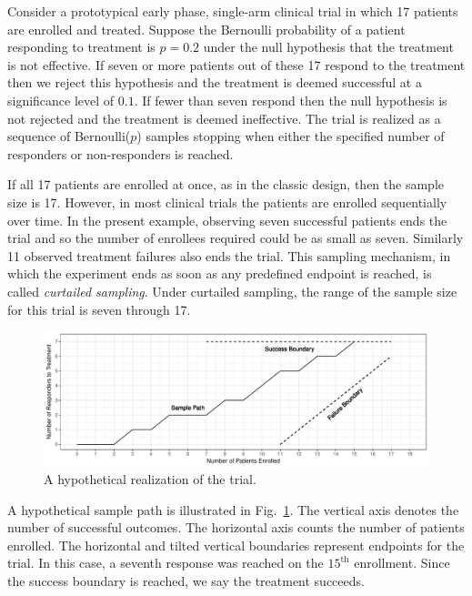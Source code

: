 \documentclass[12pt]{article}
\begin{document}
Consider a prototypical early phase, single-arm clinical trial in which 
17 patients
are enrolled and treated. Suppose the Bernoulli probability of a patient 
responding to treatment is $p=0.2$ 
under the null hypothesis that the treatment is not effective.
If seven or more patients out of these 17 respond to the treatment then we 
reject this hypothesis and the treatment is deemed successful at 
a significance level of $0.1$.  If fewer than seven respond then the null 
hypothesis is not 
rejected and the treatment is deemed ineffective. The trial is 
realized as a sequence of Bernoulli($p$) samples stopping when either
the specified number of responders or non-responders is reached.

If all 17 patients are enrolled at once, as in the classic
design, then the sample size is 17. However, in most clinical trials the
patients are enrolled sequentially over time.
In the present example, observing seven
successful patients ends the trial and so the number of enrollees required
could be as small as seven. Similarly 11
observed treatment failures also ends the trial. This sampling mechanism, in
which the experiment ends as soon as any predefined endpoint is reached, is
called {\em curtailed sampling}. Under curtailed sampling, the range of the
sample size for this trial is seven through 17.

\begin{figure}[bp!]
\centering
\includegraphics[width=\textwidth]{KanePlot.pdf}
\caption{
A hypothetical realization of the trial.
}
\label{fig:kane_viz}
\end{figure}

A hypothetical sample path is illustrated in Fig.~\ref{fig:kane_viz}.
The vertical axis denotes the number of
successful outcomes. The horizontal axis counts the number of patients 
enrolled. The horizontal and tilted vertical boundaries represent
endpoints for the trial. In this case, a seventh response was reached on
the $15^{\text{th}}$ enrollment.
Since the success boundary is reached, we say the treatment succeeds.
\end{document}
